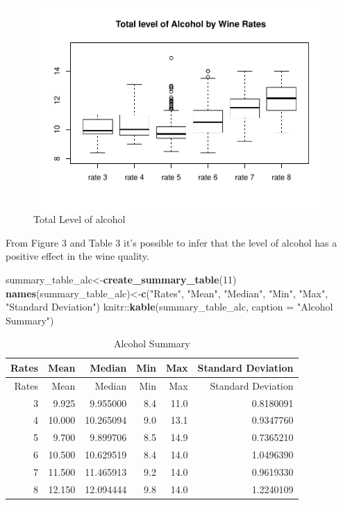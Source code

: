 \documentclass[]{article}
\newenvironment{Shaded}{\begin{snugshade}}{\end{snugshade}}
\newcommand{\KeywordTok}[1]{\textcolor[rgb]{0.13,0.29,0.53}{\textbf{{#1}}}}
\newcommand{\DataTypeTok}[1]{\textcolor[rgb]{0.13,0.29,0.53}{{#1}}}
\newcommand{\DecValTok}[1]{\textcolor[rgb]{0.00,0.00,0.81}{{#1}}}
\newcommand{\StringTok}[1]{\textcolor[rgb]{0.31,0.60,0.02}{{#1}}}
\newcommand{\NormalTok}[1]{{#1}}
\begin{document}
\begin{figure}[htbp]
\centering
\includegraphics{Project_files/figure-latex/unnamed-chunk-7-1.pdf}
\caption{Total Level of alcohol}
\end{figure}

From Figure 3 and Table 3 it's possible to infer that the level of
alcohol has a positive effect in the wine quality.

\begin{Shaded}
\begin{Highlighting}[]
\NormalTok{summary_table_alc<-}\KeywordTok{create_summary_table}\NormalTok{(}\DecValTok{11}\NormalTok{)}
\KeywordTok{names}\NormalTok{(summary_table_alc)<-}\KeywordTok{c}\NormalTok{(}\StringTok{"Rates"}\NormalTok{, }\StringTok{"Mean"}\NormalTok{, }\StringTok{"Median"}\NormalTok{, }\StringTok{"Min"}\NormalTok{, }\StringTok{"Max"}\NormalTok{, }\StringTok{"Standard Deviation"}\NormalTok{)}
\NormalTok{knitr::}\KeywordTok{kable}\NormalTok{(summary_table_alc, }\DataTypeTok{caption =} \StringTok{"Alcohol Summary"}\NormalTok{)}
\end{Highlighting}
\end{Shaded}

\begin{longtable}[c]{@{}rrrrrr@{}}
\caption{Alcohol Summary}\tabularnewline
\toprule
Rates & Mean & Median & Min & Max & Standard Deviation\tabularnewline
\midrule
\endfirsthead
\toprule
Rates & Mean & Median & Min & Max & Standard Deviation\tabularnewline
\midrule
\endhead
3 & 9.925 & 9.955000 & 8.4 & 11.0 & 0.8180091\tabularnewline
4 & 10.000 & 10.265094 & 9.0 & 13.1 & 0.9347760\tabularnewline
5 & 9.700 & 9.899706 & 8.5 & 14.9 & 0.7365210\tabularnewline
6 & 10.500 & 10.629519 & 8.4 & 14.0 & 1.0496390\tabularnewline
7 & 11.500 & 11.465913 & 9.2 & 14.0 & 0.9619330\tabularnewline
8 & 12.150 & 12.094444 & 9.8 & 14.0 & 1.2240109\tabularnewline
\bottomrule
\end{longtable}
\end{document}
